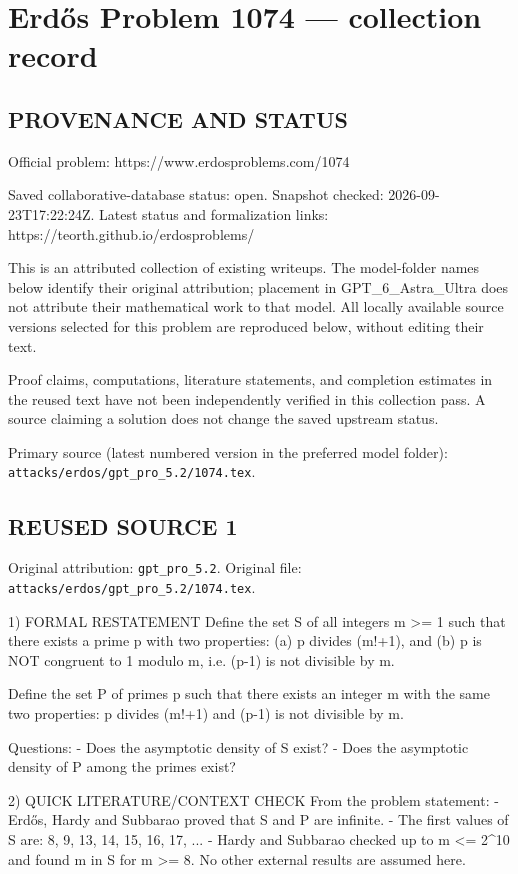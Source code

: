 \section*{Erd\H{o}s Problem 1074 --- collection record}

\subsection*{PROVENANCE AND STATUS}
Official problem: https://www.erdosproblems.com/1074

Saved collaborative-database status: open.
Snapshot checked: 2026-09-23T17:22:24Z.
Latest status and formalization links: https://teorth.github.io/erdosproblems/

This is an attributed collection of existing writeups. The model-folder names below identify their original attribution; placement in GPT\_6\_Astra\_Ultra does not attribute their mathematical work to that model. All locally available source versions selected for this problem are reproduced below, without editing their text.

Proof claims, computations, literature statements, and completion estimates in the reused text have not been independently verified in this collection pass. A source claiming a solution does not change the saved upstream status.

Primary source (latest numbered version in the preferred model folder): \texttt{attacks/erdos/gpt\_pro\_5.2/1074.tex}.

\subsection*{REUSED SOURCE 1}
Original attribution: \texttt{gpt\_pro\_5.2}.
Original file: \texttt{attacks/erdos/gpt\_pro\_5.2/1074.tex}.


1) FORMAL RESTATEMENT
Define the set S of all integers m >= 1 such that there exists a prime p with two properties:
  (a) p divides (m!+1), and
  (b) p is NOT congruent to 1 modulo m, i.e. (p-1) is not divisible by m.

Define the set P of primes p such that there exists an integer m with the same two properties:
  p divides (m!+1) and (p-1) is not divisible by m.

Questions:
- Does the asymptotic density of S exist?
- Does the asymptotic density of P among the primes exist?

2) QUICK LITERATURE/CONTEXT CHECK
From the problem statement:
- Erdős, Hardy and Subbarao proved that S and P are infinite.
- The first values of S are: 8, 9, 13, 14, 15, 16, 17, ...
- Hardy and Subbarao checked up to m <= 2^10 and found m in S for m >= 8.
No other external results are assumed here.

